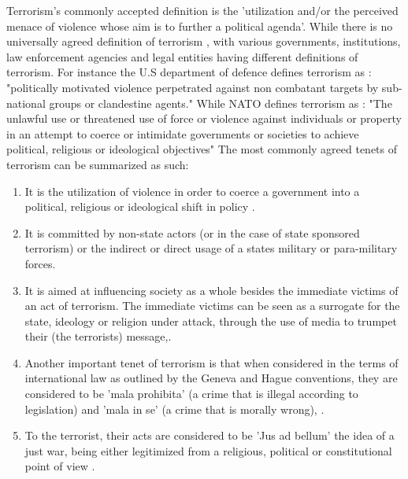 Terrorism's commonly accepted definition is the 'utilization and/or the perceived menace of violence whose aim is to further a political agenda'. While there is no universally agreed definition of terrorism \citep{ruby2002definition}, with various governments, institutions, law enforcement agencies and legal entities having different definitions of terrorism. For instance the U.S department of defence defines terrorism as \citep{pub1998pub}:
"politically motivated violence perpetrated against non combatant targets by sub-national groups or clandestine agents."
While NATO defines terrorism as \citep{chase2013defining}:
"The unlawful use or threatened use of force or violence against individuals or property in an attempt to coerce or intimidate governments or societies to achieve political, religious or ideological objectives"
The most commonly agreed tenets of terrorism can be summarized as such:
\begin{enumerate}
\item It is the utilization of violence in order to coerce a government into a political, religious or ideological shift in policy \citep{chase2013defining}.
\item It is committed by non-state actors (or in the case of state sponsored terrorism) or the indirect or direct usage of a states military or para-military forces.
\item It is aimed at influencing society as a whole besides the immediate victims of an act of terrorism. The immediate victims can be seen as a surrogate for the state, ideology or religion under attack, through the use of media to trumpet their (the terrorists) message,\citep{el2014terrorist}.
\item Another important tenet of terrorism is that when considered in the terms of international law as outlined by the Geneva and Hague conventions, they are considered to be 'mala prohibita' (a crime that is illegal according to legislation) and 'mala in se' (a crime that is morally wrong), \citep{ganor2002defining}.
\item To the terrorist, their acts are considered to be 'Jus ad bellum' the idea of a just war, being either legitimized from a religious, political or constitutional point of view \citep{kennedy1999one}. 
\end{enumerate}

